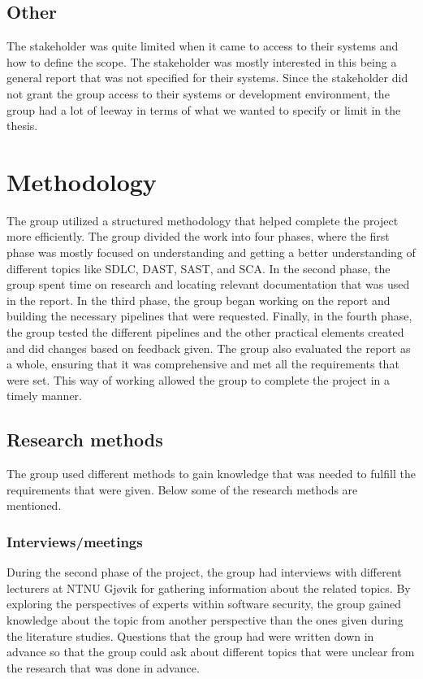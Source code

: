 \subsection{Other}
The stakeholder was quite limited when it came to access to their systems and how to define the scope. The stakeholder was mostly interested in this being a general report that was not specified for their systems. Since the stakeholder did not grant the group access to their systems or development environment, the group had a lot of leeway in terms of what we wanted to specify or limit in the thesis. 


\section{Methodology}
The group utilized a structured methodology that helped complete the project more efficiently. The group divided the work into four phases, where the first phase was mostly focused on understanding and getting a better understanding of different topics like SDLC, DAST, SAST, and SCA. In the second phase, the group spent time on research and locating relevant documentation that was used in the report. In the third phase, the group began working on the report and building the necessary pipelines that were requested. Finally, in the fourth phase, the group tested the different pipelines and the other practical elements created and did changes based on feedback given. The group also evaluated the report as a whole, ensuring that it was comprehensive and met all the requirements that were set. This way of working allowed the group to complete the project in a timely manner. 

\subsection{Research methods}
The group used different methods to gain knowledge that was needed to fulfill the requirements that were given. Below some of the research methods are mentioned. 

\subsubsection{Interviews/meetings}
During the second phase of the project, the group had interviews with different lecturers at NTNU Gjøvik for gathering information about the related topics. By exploring the perspectives of experts within software security, the group gained knowledge about the topic from another perspective than the ones given during the literature studies. Questions that the group had were written down in advance so that the group could ask about different topics that were unclear from the research that was done in advance.   

